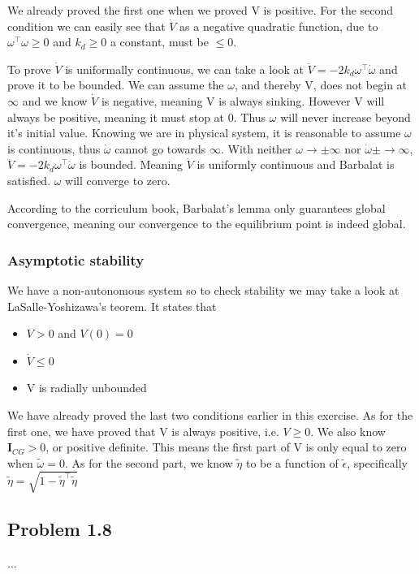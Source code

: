 We already proved the first one when we proved V is positive. For the second condition we can easily see that $\dot{V}$ as a negative quadratic function, due to $\omega^\top\omega \geq 0$ and $k_d \geq 0$ a constant, must be $\leq 0$.

To prove $\dot{V}$ is uniformally continuous, we can take a look at $\ddot{V} = -2k_d\omega^\top\dot{\omega}$ and prove it to be bounded. We can assume the $\omega$, and thereby V, does not begin at $\infty$ and we know $\dot{V}$ is negative, meaning V is always sinking. However V will always be positive, meaning it must stop at 0. Thus $\omega$ will never increase beyond it's initial value. Knowing we are in physical system, it is reasonable to assume $\omega$ is continuous, thus $\dot{\omega}$ cannot go towards $\infty$. With neither $\omega \rightarrow \pm\infty$ nor $\dot{\omega} \pm\rightarrow \infty$, $\ddot{V} = -2k_d\omega^\top\dot{\omega}$ is bounded. Meaning $\dot{V}$ is uniformly continuous and Barbalat is satisfied. $\omega$ will converge to zero. 

According to the corriculum book\cite{Fossen2011}, Barbalat's lemma only guarantees global convergence, meaning our convergence to the equilibrium point is indeed global.

\subsubsection*{Asymptotic stability}

We have a non-autonomous system so to check stability we may take a look at LaSalle-Yoshizawa's teorem. It states that

\begin{itemize}
    \item $V > 0$ and  $V(0) = 0$
    \item $\dot{V} \leq 0$
    \item V is radially unbounded
\end{itemize}

We have already proved the last two conditions earlier in this exercise. As for the first one, we have proved that V is always positive, i.e. $V \geq 0$. We also know $\mathbf{I}_{CG} > 0$, or positive definite. This means the first part of V is only equal to zero when $\tilde{\omega} = 0$. As for the second part, we know $\tilde{\eta}$ to be a function of $\tilde{\epsilon}$, specifically $\tilde{\eta} = \sqrt{1 - \tilde{\eta}^\top\tilde{\eta}}$


\subsection*{Problem 1.8}
...


